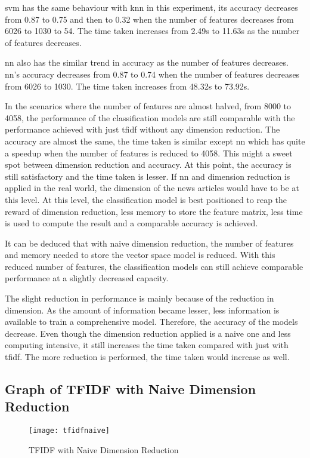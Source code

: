 \Ac{svm} has the same behaviour with \ac{knn} in this experiment, its accuracy decreases from 0.87 to 0.75 and then to 0.32 when the number of features decreases from 6026 to 1030 to 54. The time taken increases from 2.49s to 11.63s as the number of features decreases.

\Ac{nn} also has the similar trend in accuracy as the number of features decreases. \Ac{nn}'s accuracy decreases from 0.87 to 0.74 when the number of features decreases from 6026 to 1030. The time taken increases from 48.32s to 73.92s.

In the scenarios where the number of features are almost halved, from 8000 to 4058, the performance of the classification models are still comparable with the performance achieved with just \ac{tfidf} without any dimension reduction. The accuracy are almost the same, the time taken is similar except \ac{nn} which has quite a speedup when the number of features is reduced to 4058. This might a sweet spot between dimension reduction and accuracy. At this point, the accuracy is still satisfactory and the time taken is lesser. If \ac{nn} and dimension reduction is applied in the real world, the dimension of the news articles would have to be at this level. At this level, the classification model is best positioned to reap the reward of dimension reduction, less memory to store the feature matrix, less time is used to compute the result and a comparable accuracy is achieved.

It can be deduced that with naive dimension reduction, the number of features and memory needed to store the vector space model is reduced. With this reduced number of features, the classification models can still achieve comparable performance at a slightly decreased capacity.

The slight reduction in performance is mainly because of the reduction in dimension. As the amount of information became lesser, less information is available to train a comprehensive model. Therefore, the accuracy of the models decrease. Even though the dimension reduction applied is a naive one and less computing intensive, it still increases the time taken compared with just with \ac{tfidf}. The more reduction is performed, the time taken would increase as well.

\subsection{Graph of TFIDF with Naive Dimension Reduction}
\begin{figure} [H]
	\centering
	\texttt{[image: tfidfnaive]}
	\caption{TFIDF with Naive Dimension Reduction}
	\label{fig:tfidfnaive}
\end{figure}

